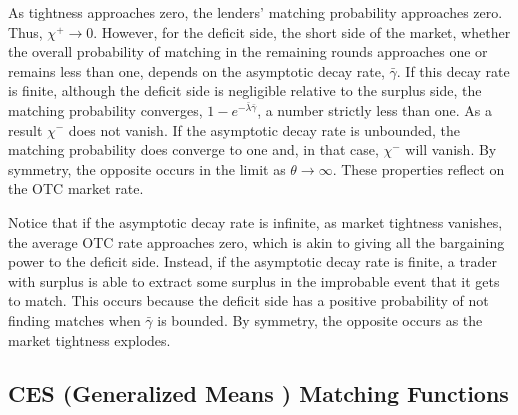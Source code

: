 \documentclass[12pt,american,english,notitlepage]{article}
\begin{document}
As tightness approaches zero, the lenders' matching probability approaches
zero. Thus, $\chi^{+}\rightarrow0$. However, for the deficit side,
the short side of the market, whether the overall probability of matching
in the remaining rounds approaches one or remains less than one, depends
on the asymptotic decay rate, $\bar{\gamma}$. If this decay rate
is finite, although the deficit side is negligible relative to the
surplus side, the matching probability converges, $1-e^{-\bar{\lambda}\bar{\gamma}}$,
a number strictly less than one. As a result $\chi^{-}$ does not
vanish. If the asymptotic decay rate is unbounded, the matching probability
does converge to one and, in that case, $\chi^{-}$ will vanish. By
symmetry, the opposite occurs in the limit as $\theta\rightarrow\infty$.
These properties reflect on the OTC market rate.

Notice that if the asymptotic decay rate is infinite,
as market tightness vanishes, the average OTC rate approaches zero, which is
akin to giving all the bargaining power to the deficit side. 
Instead, if the asymptotic decay rate is finite, a trader with surplus
is able to extract some surplus in the improbable event that it
gets to match. This occurs because the deficit side has a positive
probability of not finding matches when $\bar{\gamma}$ is bounded.
By symmetry, the opposite occurs as the market tightness explodes. 


%

\subsection{CES (Generalized Means ) Matching Functions}
\end{document}
